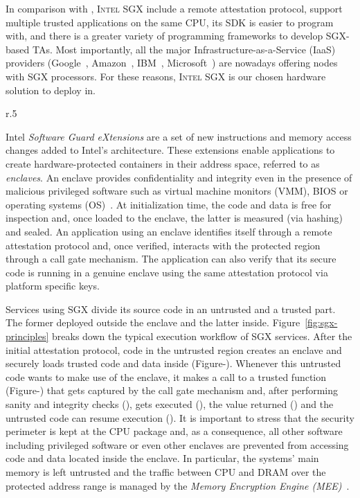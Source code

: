 In comparison with \arm \tz, \textsc{Intel SGX} include a remote attestation protocol, support multiple trusted applications on the same CPU, its SDK is easier to program with, and there is a greater variety of programming frameworks to develop SGX-based TAs.
Most importantly, all the major Infrastructure-as-a-Service (IaaS) providers (Google~\cite{gceskylake}, Amazon~\cite{amazonskylake}, IBM~\cite{ibm-sgx}, Microsoft~\cite{azureconfidential}) are nowadays offering nodes with SGX processors.
For these reasons, \textsc{Intel SGX} is our chosen hardware solution to deploy \projName in.
\begin{wrapfigure}{r}{.5\textwidth}
    \centering
    
    \caption{\textsc{Intel SGX} execution workflow.\label{fig:sgx-principles}}
\end{wrapfigure}
Intel \textit{Software Guard eXtensions} are a set of new instructions and memory access changes added to Intel's architecture.
These extensions enable applications to create hardware-protected containers in their address space, referred to as \emph{enclaves}.
An enclave provides confidentiality and integrity even in the presence of malicious privileged software such as virtual machine monitors (VMM), BIOS or operating systems (OS)~\cite{McKeen2013}. 
At initialization time, the code and data is free for inspection and, once loaded to the enclave, the latter is measured (via hashing) and sealed. 
An application using an enclave identifies itself through a remote attestation protocol and, once verified, interacts with the protected region through a call gate mechanism.
The application can also verify that its secure code is running in a genuine enclave using the same attestation protocol via platform specific keys. %

Services using SGX divide its source code in an untrusted and a trusted part.
The former deployed outside the enclave and the latter inside.
Figure~\ref{fig:sgx-principles} breaks down the typical execution workflow of SGX services.
After the initial attestation protocol, code in the untrusted region creates an enclave and securely loads trusted code and data inside (Figure-). 
Whenever this untrusted code wants to make use of the enclave, it makes a call to a trusted function (Figure-) that gets captured by the call gate mechanism and, after performing sanity and integrity checks (), gets executed (), the value returned () and the untrusted code can resume execution ().
It is important to stress that the security perimeter is kept at the CPU package and, as a consequence, all other software including privileged software or even other enclaves are prevented from accessing code and data located inside the enclave. 
In particular, the systems' main memory is left untrusted and the traffic between CPU and DRAM over the protected address range is managed by the \textit{Memory Encryption Engine (MEE)}~\cite{Gueron16}.

